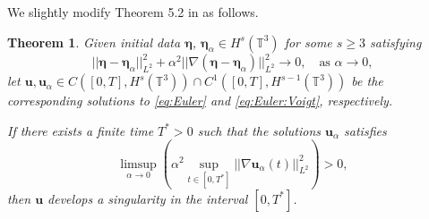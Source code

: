 \documentclass[leqno,10pt,a4paper]{amsart}
\newtheorem{thm}{Theorem}[section]
\theoremstyle{definition}
\numberwithin{equation}{section}
\newcommand{\mbb}[1]{\mathbb{#1}}
\newcommand{\bds}{\boldsymbol}
\def\bbeta{\boldsymbol{\eta}}
\begin{document}
We slightly modify Theorem 5.2 in \cite{Larios:Titi:2010} as follows.
%
\begin{thm}\label{thm:blowup}
Given initial data $\bbeta$, $\bbeta_\alpha \in H^s(\mbb T^3)$ for some $s\geq 3$ satisfying
%
\begin{equation}
||\bds \eta - \bds \eta_\alpha||_{L^2}^2 
+ \alpha^2 ||\nabla(\bds \eta - \bds \eta_\alpha)||_{L^2}^2 \to 0, \quad \text{as } \alpha \to 0,
\end{equation}
%
let $\bds u, \bds u_\alpha \in C([0, T], H^s(\mbb T^3)) \cap C^1([0, T], H^{s-1}(\mbb T^3))$ be the corresponding solutions to \eqref{eq:Euler} and \eqref{eq:Euler:Voigt}, respectively. 

If there exists a finite time $T^* > 0$ such that the solutions $\bds u_\alpha$ satisfies
%
\begin{equation}
\limsup_{\alpha\to 0} \left(\alpha^2 \sup_{t \in [0, T^*]}||\nabla \bds u_\alpha(t)||^2_{L^2}\right)> 0,
\end{equation}
%
then $\bds u$ develops a singularity in the interval $[0, T^{*}]$.
\end{thm}
%
\end{document}
